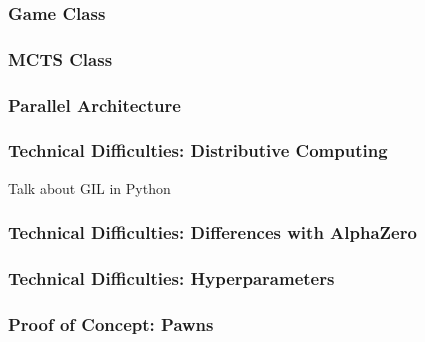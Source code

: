 \documentclass{beamer}
\begin{document}

\begin{frame}
\frametitle{Game Class}
\end{frame}



\begin{frame}
\frametitle{MCTS Class}
\end{frame}



\begin{frame}
\frametitle{Parallel Architecture}
\end{frame}



\begin{frame}
\frametitle{Technical Difficulties: Distributive Computing}
Talk about GIL in Python
\end{frame}



\begin{frame}
\frametitle{Technical Difficulties: Differences with AlphaZero}
\end{frame}



\begin{frame}
\frametitle{Technical Difficulties: Hyperparameters}
\end{frame}



\begin{frame}
\frametitle{Proof of Concept: Pawns}
\end{frame}

\end{document}
